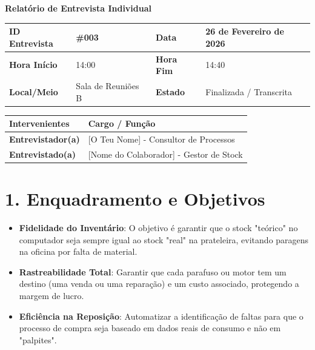 \documentclass[11pt,a4paper]{article}
\begin{document}
	
	{\noindent\LARGE\bfseries\color{primaryblue} Relatório de Entrevista Individual}
	\\[0.5cm]
	
	\renewcommand{\arraystretch}{1.5}
	\begin{tabularx}{\textwidth}{@{}|l|X|l|X|@{}}
		\hline
		\rowcolor{gray!10} \textbf{ID Entrevista} & \#003 & \textbf{Data} & 26 de Fevereiro de 2026 \\ \hline
		\textbf{Hora Início} & 14:00 & \textbf{Hora Fim} & 14:40 \\ \hline
		\textbf{Local/Meio} & Sala de Reuniões B & \textbf{Estado} & Finalizada / Transcrita \\ \hline
	\end{tabularx}
	
	\vspace{0.5cm}
	
	\begin{tabularx}{\textwidth}{@{}|l|X|@{}}
		\hline
		\rowcolor{gray!10} \textbf{Intervenientes} & \textbf{Cargo / Função} \\ \hline
		\textbf{Entrevistador(a)} & [O Teu Nome] - Consultor de Processos \\ \hline
		\textbf{Entrevistado(a)}  & [Nome do Colaborador] - Gestor de Stock \\ \hline
	\end{tabularx}
	
	\vspace{0.8cm}
	
	\section*{1. Enquadramento e Objetivos}
	\begin{itemize}[leftmargin=*, label=\small\color{primaryblue}$\blacksquare$]
		\item \textbf{Fidelidade do Inventário}: O objetivo é garantir que o stock "teórico" no computador seja sempre igual ao stock "real" na prateleira, evitando paragens na oficina por falta de material.
		\item \textbf{Rastreabilidade Total}: Garantir que cada parafuso ou motor tem um destino (uma venda ou uma reparação) e um custo associado, protegendo a margem de lucro.
		\item \textbf{Eficiência na Reposição}: Automatizar a identificação de faltas para que o processo de compra seja baseado em dados reais de consumo e não em "palpites".
	\end{itemize}
	
\end{document}
